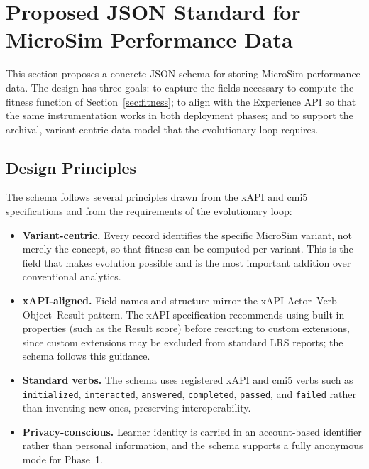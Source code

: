 \section{Proposed JSON Standard for MicroSim Performance Data}

This section proposes a concrete JSON schema for storing MicroSim performance
data. The design has three goals: to capture the fields necessary to compute
the fitness function of Section~\ref{sec:fitness}; to align with the
Experience API so that the same instrumentation works in both deployment
phases; and to support the archival, variant-centric data model that the
evolutionary loop requires.

\subsection{Design Principles}

The schema follows several principles drawn from the xAPI and
cmi5~\cite{aicc2015cmi5} specifications and from the requirements of the
evolutionary loop:

\begin{itemize}
    \item \textbf{Variant-centric.} Every record identifies the specific
          MicroSim variant, not merely the concept, so that fitness can be
          computed per variant. This is the field that makes evolution possible
          and is the most important addition over conventional analytics.
    \item \textbf{xAPI-aligned.} Field names and structure mirror the xAPI
          Actor--Verb--Object--Result pattern. The xAPI specification recommends
          using built-in properties (such as the Result score) before resorting
          to custom extensions, since custom extensions may be excluded from
          standard LRS reports; the schema follows this guidance.
    \item \textbf{Standard verbs.} The schema uses registered xAPI and cmi5
          verbs such as \texttt{initialized}, \texttt{interacted},
          \texttt{answered}, \texttt{completed}, \texttt{passed}, and
          \texttt{failed} rather than inventing new ones, preserving
          interoperability.
    \item \textbf{Privacy-conscious.} Learner identity is carried in an
          account-based identifier rather than personal information, and the
          schema supports a fully anonymous mode for Phase~1.
\end{itemize}

